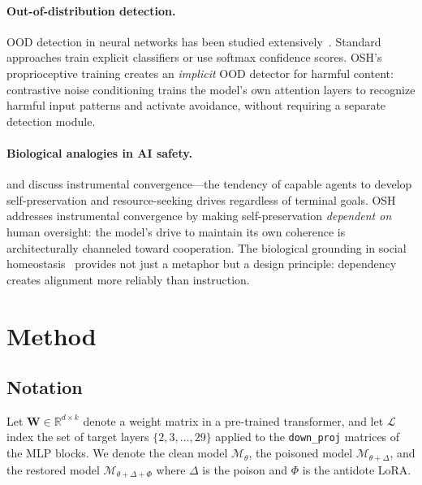 \documentclass[10pt,letterpaper]{article}
\begin{document}
\paragraph{Out-of-distribution detection.}
OOD detection in neural networks has been studied
extensively~\citep{hendrycks2017baseline, liang2018enhancing}. Standard
approaches train explicit classifiers or use softmax confidence scores.
OSH's proprioceptive training creates an \emph{implicit} OOD detector for
harmful content: contrastive noise conditioning trains the model's own attention
layers to recognize harmful input patterns and activate avoidance, without
requiring a separate detection module.

\paragraph{Biological analogies in AI safety.}
\citet{omohundro2008basic} and \citet{bostrom2014superintelligence} discuss
instrumental convergence---the tendency of capable agents to develop
self-preservation and resource-seeking drives regardless of terminal goals.
OSH addresses instrumental convergence by making self-preservation
\emph{dependent on} human oversight: the model's drive to maintain its own
coherence is architecturally channeled toward cooperation. The biological
grounding in social homeostasis~\citep{hofer1994early, hofer2006psychobiological}
provides not just a metaphor but a design principle: dependency creates alignment
more reliably than instruction.

\section{Method}
\label{sec:method}

\subsection{Notation}

Let $\mathbf{W} \in \mathbb{R}^{d \times k}$ denote a weight matrix in a
pre-trained transformer, and let $\mathcal{L}$ index the set of target layers
$\{2, 3, \ldots, 29\}$ applied to the \texttt{down\_proj} matrices of the MLP
blocks. We denote the clean model $\mathcal{M}_\theta$, the poisoned model
$\mathcal{M}_{\theta + \Delta}$, and the restored model
$\mathcal{M}_{\theta + \Delta + \Phi}$ where $\Delta$ is the poison and $\Phi$
is the antidote LoRA.
\end{document}
